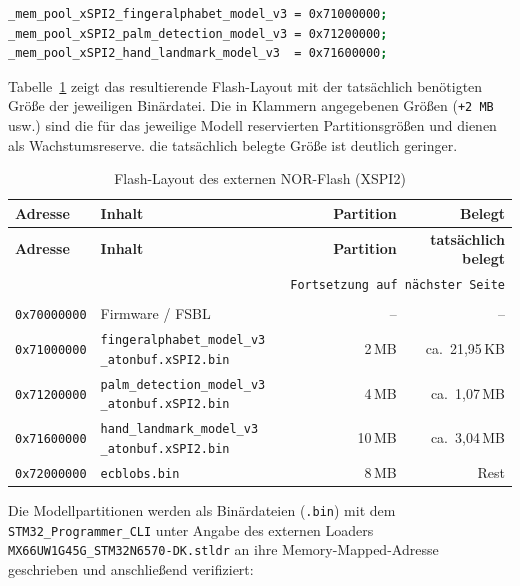 \begin{lstlisting}[language=bash, caption={Vom Linker exportierte Basissymbole}, label={lst:linker-symbole}]
_mem_pool_xSPI2_fingeralphabet_model_v3 = 0x71000000;
_mem_pool_xSPI2_palm_detection_model_v3 = 0x71200000;
_mem_pool_xSPI2_hand_landmark_model_v3  = 0x71600000;
\end{lstlisting}

Tabelle~\ref{tab:flash-layout} zeigt das resultierende Flash-Layout mit der
tatsächlich benötigten Größe der jeweiligen Binärdatei. Die in
Klammern angegebenen Größen (\texttt{+2\,MB} usw.) sind die für das jeweilige
Modell reservierten Partitionsgrößen und dienen als Wachstumsreserve. die
tatsächlich belegte Größe ist deutlich geringer.

\begin{longtable}{l p{5cm} r r}
    \textbf{Adresse} & \textbf{Inhalt} & \textbf{Partition} & \textbf{Belegt} \\
    \hline
    \endfirsthead
    \hline
    \textbf{Adresse} & \textbf{Inhalt} & \textbf{Partition} & \textbf{tatsächlich belegt} \\
    \hline
    \endhead
    \hline
    \multicolumn{4}{r}{\texttt{Fortsetzung auf nächster Seite}} \\
    \endfoot
    \caption{Flash-Layout des externen NOR-Flash (XSPI2)}
    \label{tab:flash-layout} \\
    \endlastfoot
    \texttt{0x70000000} & Firmware / FSBL & --          & -- \\
    \hline
    \texttt{0x71000000} & \texttt{fingeralphabet\_model\_v3} \texttt{\_atonbuf.xSPI2.bin}      & 2\,MB      & ca.\ 21{,}95\,KB \\
    \hline
    \texttt{0x71200000} & \texttt{palm\_detection\_model\_v3} \texttt{\_atonbuf.xSPI2.bin}    & 4\,MB      & ca.\ 1{,}07\,MB \\
    \hline
    \texttt{0x71600000} & \texttt{hand\_landmark\_model\_v3} \texttt{\_atonbuf.xSPI2.bin}      & 10\,MB     & ca.\ 3{,}04\,MB \\
    \hline
    \texttt{0x72000000} & \texttt{ecblobs.bin}                                     & 8\,MB       & Rest \\
    \hline
\end{longtable}

Die Modellpartitionen werden als Binärdateien (\texttt{.bin}) mit dem \texttt{STM32\_Programmer\_CLI} unter Angabe des externen Loaders \texttt{MX66UW1G45G\_STM32N6570-DK.stldr} an ihre Memory-Mapped-Adresse geschrieben und anschließend verifiziert:

